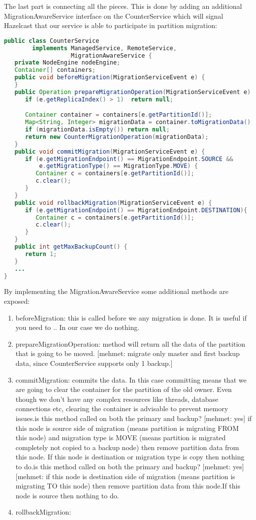 The last part is connecting all the pieces. This is done by adding an additional MigrationAwareService interface on the CounterService which will signal Hazelcast that our service is able to participate in partition migration:
\begin{lstlisting}[language=java]
public class CounterService 
        implements ManagedService, RemoteService, 
                   MigrationAwareService {
   private NodeEngine nodeEngine;
   Container[] containers;
   public void beforeMigration(MigrationServiceEvent e) {
   } 
   public Operation prepareMigrationOperation(MigrationServiceEvent e) {
      if (e.getReplicaIndex() > 1)  return null;

      Container container = containers[e.getPartitionId()];
      Map<String, Integer> migrationData = container.toMigrationData();
      if (migrationData.isEmpty()) return null;
      return new CounterMigrationOperation(migrationData);
   }
   public void commitMigration(MigrationServiceEvent e) {
      if (e.getMigrationEndpoint() == MigrationEndpoint.SOURCE && 
          e.getMigrationType() == MigrationType.MOVE) {
         Container c = containers[e.getPartitionId()];
         c.clear();
      }
   }
   public void rollbackMigration(MigrationServiceEvent e) {
      if (e.getMigrationEndpoint() == MigrationEndpoint.DESTINATION){
         Container c = containers[e.getPartitionId()];
         c.clear();
      }
   }
   public int getMaxBackupCount() {
      return 1;
   }
   ...
}
\end{lstlisting}
By implementing the MigrationAwareService some additional methods are exposed:
\begin{enumerate}
\item beforeMigration: this is called before we any migration is done. It is useful if you need to .. In our case we do nothing.
\item prepareMigrationOperation: method will return all the data of the partition that is going to be moved.
[mehmet: migrate only master and first backup data, since CounterService supports only 1 backup.]
\item commitMigration: commits the data. In this case committing means that we are going to clear the container for the partition of the old owner. Even though we don't have any complex resources like threads, database connections etc, clearing the container is advisable to prevent memory issues.is this method called on both the primary and backup? [mehmet: yes] if this node is source side of migration (means partition is migrating FROM this node) and migration type is MOVE (means partition is migrated completely not copied to a backup node) then remove partition data from this node. If this node is destination or migration type is copy then nothing to do.is this method called on both the primary and backup? [mehmet: yes][mehmet: if this node is destination side of migration (means partition is migrating TO this node) then remove partition data from this node.If this node is source then nothing to do.
\item rollbackMigration: 
\end{enumerate}

